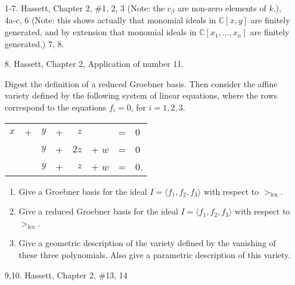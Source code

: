 \documentclass[11pt]{report}
\newcommand\CC{{\mathbb C}}
\newcommand\lex{>_{\operatorname{lex}}}
\begin{document}

\vskip 1cm

\begin{enumerate}

\item[1-7.]  Hassett, Chapter 2, \#1, 2, 3 (Note: the $c_\beta$ are non-zero elements of $k$.), 4a-c, 6 (Note:  this shows
actually that monomial ideals in $\CC[x,y]$ are finitely generated, and by extension that monomial ideals in 
$\CC[x_1, \dots, x_n]$ are finitely generated.) 7, 8.

\item[8.] Hassett, Chapter 2, Application of number 11.

Digest the definition of a reduced Groebner basis.  Then consider the affine variety defined by the 
following system of linear equations, where the rows correspond to the equations $f_i = 0$, for $i = 1,2,3$.

\begin{center}
\begin{tabular}{ccccrccl}
$x$  &+ &$y$ &+ &$z$ &&= &0\\
&& $y$ &+ & $2z$ & + $w$ &= &0\\
&&$y$& +&$z$ &+ $w$ &= &0.
\end{tabular}
\end{center}

\begin{enumerate}

\item Give a Groebner basis for the ideal $I = \langle f_1, f_2, f_3 \rangle$ with respect to $\lex$.

\item Give a reduced Groebner basis for the ideal $I = \langle f_1, f_2, f_3 \rangle$ with respect to $\lex$.

\item Give a geometric description of the variety defined by the vanishing of these three polynomials.  Also
give a parametric description of this variety.
\end{enumerate}

\item[9,10.]  Hassett, Chapter 2, \#13, 14
\end{enumerate}
\end{document}
